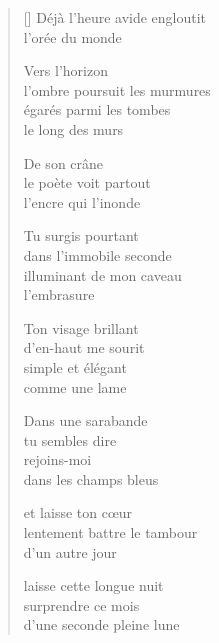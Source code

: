 \documentclass[12pt,a4paper]{article}
\begin{document}

\newpage

\poemtitle{}

\settowidth{\versewidth}{l'ombre poursuit les murmures}

\bigskip

\begin{verse}[\versewidth]
  Déjà l'heure avide
  engloutit \\
  l'orée du monde

  Vers l'horizon \\
  l'ombre poursuit les murmures \\
  égarés parmi les tombes\\
  le long des murs

  De son crâne \\
  le poète voit partout \\
  l'encre qui l'inonde

  Tu surgis pourtant \\
  dans l'immobile seconde \\
  illuminant de mon caveau \\
  l'embrasure

  Ton visage brillant \\
  d'en-haut me sourit \\
  simple et élégant \\
  comme une lame

  Dans une sarabande \\
  tu sembles dire \\
  rejoins-moi \\
  dans les champs bleus

  et laisse ton cœur \\
  lentement battre le tambour \\
  d'un autre jour

  laisse cette longue nuit \\
  surprendre ce mois \\
  d'une seconde pleine lune
\end{verse}


\newpage

\poemtitle{}

\settowidth{\versewidth}{le firmament en soleils innombrables}

\bigskip
\end{document}
